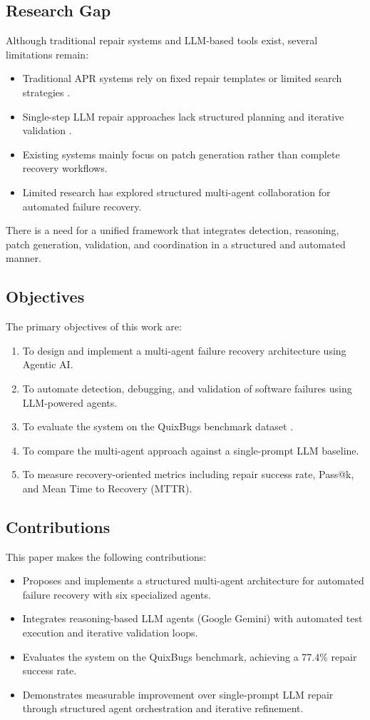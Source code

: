 \documentclass[conference]{IEEEtran}
\begin{document}
\subsection{Research Gap}
Although traditional repair systems and LLM-based tools exist, several limitations remain:
\begin{itemize}
    \item Traditional APR systems rely on fixed repair templates or limited search strategies \cite{genprog, templateapr}.
    \item Single-step LLM repair approaches lack structured planning and iterative validation \cite{alpharepair}.
    \item Existing systems mainly focus on patch generation rather than complete recovery workflows.
    \item Limited research has explored structured multi-agent collaboration for automated failure recovery.
\end{itemize}

There is a need for a unified framework that integrates detection, reasoning, patch generation, validation, and coordination in a structured and automated manner.

\subsection{Objectives}
The primary objectives of this work are:
\begin{enumerate}
    \item To design and implement a multi-agent failure recovery architecture using Agentic AI.
    \item To automate detection, debugging, and validation of software failures using LLM-powered agents.
    \item To evaluate the system on the QuixBugs benchmark dataset \cite{quixbugs}.
    \item To compare the multi-agent approach against a single-prompt LLM baseline.
    \item To measure recovery-oriented metrics including repair success rate, Pass@k, and Mean Time to Recovery (MTTR).
\end{enumerate}

\subsection{Contributions}
This paper makes the following contributions:
\begin{itemize}
    \item Proposes and implements a structured multi-agent architecture for automated failure recovery with six specialized agents.
    \item Integrates reasoning-based LLM agents (Google Gemini) with automated test execution and iterative validation loops.
    \item Evaluates the system on the QuixBugs benchmark, achieving a 77.4\% repair success rate.
    \item Demonstrates measurable improvement over single-prompt LLM repair through structured agent orchestration and iterative refinement.
\end{itemize}
\end{document}
